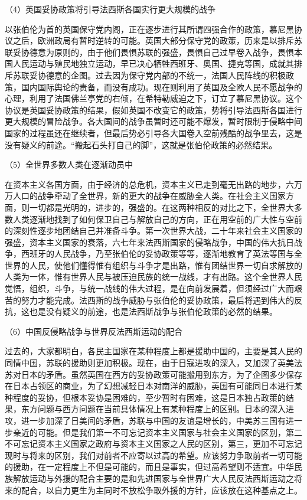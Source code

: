 \documentclass[UTF8, 12pt, a4paper]{ctexrep}
\begin{document}
（4）英国妥协政策将引导法西斯各国实行更大规模的战争

以张伯伦为首的英国保守党内阁，正在逐步进行其所谓四强合作的政策，慕尼黑协议之后，欧洲政局有暂时逆转的可能。英国大部分保守党的政策，历来是以排斥苏联妥协德意为原则的，由于他们畏惧苏联的强盛，畏惧自己过早卷入战争，畏惧本国人民运动与殖民地独立运动，早已决心牺牲西班牙、奥国、捷克等国，成就其排斥苏联妥协德意的企图。过去因为保守党内部的不统一，法国人民阵线的积极政策，国内国际舆论的责备，而没有成功。现在则利用了英国及全欧人民不愿战争的心理，利用了法国佛兰亭党的右倾，在希特勒威迫之下，订立了慕尼黑协议。这个协议是英国妥协政策的结果，假如英国不改变它的政策，势将引导法西斯各国进行更大规模的冒险战争。各大国间的战争虽暂时还可能不爆发，暂时限制于侵略中间国家的过程虽还在继续者，但最后势必引导各大国卷入空前残酷的战争里去，这是没有疑义的前途。“搬起石头打自己的脚”，这就是张伯伦政策的必然结果。

（5）全世界多数人类在逐渐动员中

在资本主义各国方面，由于经济的总危机，资本主义已走到毫无出路的地步，六万万人口的战争牵动了全世界，新的更大的战争在威胁全人类。在社会主义国家方面，则一切都是光明的，进步的，强盛的。在这两种相反的对比之下，全世界大多数人类逐渐地找到了如何保卫自己与解放自己的方向，正在用空前的广大性与空前的深刻性逐步地团结自己并准备斗争。第一次世界大战，二十年来社会主义国家的强盛，资本主义国家的衰落，六七年来法西斯国家的侵略战争，中国的伟大抗日战争，西班牙的人民战争，乃至张伯伦的妥协政策等等，逐渐地教育了英法等国与全世界的人民，使他们懂得惟有组织与斗争才是出路，惟有团结世界一切自求解放的人类为一体，惟有世界人民与被压迫民族的统一战线，才有出路。这个全世界人民觉悟，组织，斗争，与统一战线的伟大过程，是在向前发展着，但须经过广大而艰苦的努力才能完成。法西斯的战争威胁与张伯伦的妥协政策，最后将遇到伟大的反抗，这也是没有疑义的前途，也是法西斯战争与张伯伦政策的必然的结果。

（6）中国反侵略战争与世界反法西斯运动的配合

过去的，大家都明白，各民主国家在某种程度上都是援助中国的，主要是其人民的同情中国，苏联的援助则更加积极。现在，由于日寇进攻的深入，又加深了英美法苏对日本的矛盾。虽然英国在西方的妥协政策可能搬用到东方，为了企图多少保存在日本占领区的商业，为了幻想减轻日本对南洋的威胁，英国有可能同日本进行某种程度的妥协，但根本妥协是困难的，至少暂时有困难，这是日本独占政策的结果，东方问题与西方问题在当前具体情况上有某种程度上的区别。日本的深入进攻，进一步加深了日美间的矛盾，苏联与中国的友谊是增长的，中美苏三国有进一步亲近的可能。但是我们第一不可忘记资本主义国家与社会主义国家的区别，第二不可忘记资本主义国家之政府与资本主义国家之人民的区别，第三，更加不可忘记现时与将来的区别，我们对前者不应寄以过高的希望。应该努力争取前者一切可能的援助，在一定程度上不但是可能的，而且是事实，但过高希望则不适宜。中华民族解放运动与外援的配合主要的是和先进国家与全世界广大人民反法西斯运动之将来的配合，以自力更生为主同时不放松争取外援的方针，应该放在这种基点之上。
\end{document}
